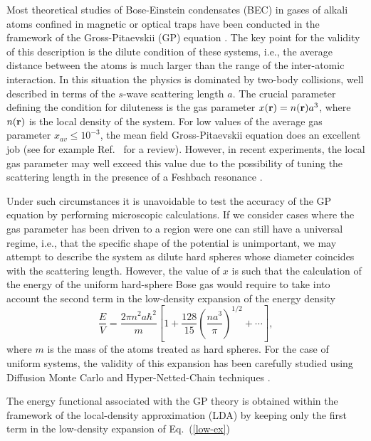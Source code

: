 Most theoretical studies of Bose-Einstein condensates (BEC)
in gases of alkali atoms confined in magnetic or optical traps 
have been conducted in the framework of the 
Gross-Pitaevskii (GP) equation \cite{gross1961,pita1961}. 
The key point for the validity of this description is the
dilute condition of these systems, i.e., the average distance between
the atoms is much larger than the range of the inter-atomic interaction. In
this situation the physics is dominated by two-body collisions,
well described in terms of the $s$-wave scattering length
$a$.  The crucial parameter defining the condition for diluteness is the
gas parameter $x({\bf r})= n({\bf r}) a^3$, where $n({\bf r})$ is the
local density of the system. For low values of the average gas
parameter $x_{av}\le 10^{-3}$, the mean field Gross-Pitaevskii
equation does an excellent job (see for example 
Ref.~\cite{dalfovo1999} for a review). 
However, in recent
experiments, the local gas parameter may well exceed this value due to
the possibility of tuning the scattering length in the presence of a  
Feshbach resonance \cite{cornish00}. 

Under such circumstances it is unavoidable to test the accuracy of
the GP equation by performing microscopic calculations. If we consider cases
where the gas parameter has been driven to a region were one
can still have a universal regime, i.e., that the specific shape of
the potential is unimportant, we may attempt to describe the system as dilute
hard spheres whose diameter coincides with the scattering length.
However, the value of $x$ is such that the
calculation of the energy of the uniform hard-sphere Bose gas would
require to take into account the second term in the low-density
expansion \cite{fetter} of the energy density
\begin{equation}
  \frac {E}{V} = \frac {2 \pi n^2 a \hbar^2}{m}
  \left [ 1 + \frac {128}{15} \left ( \frac {n a^3}{\pi} \right)^{1/2}
          + \cdots \right ],
\label{low-ex}
\end{equation}
where $m$ is the mass of the atoms treated as hard spheres.
For the case of uniform systems, the validity of this expansion has been 
carefully studied using Diffusion Monte Carlo \cite{boro99} and
Hyper-Netted-Chain techniques \cite{mazz03}.

The energy functional associated with the GP theory is obtained
within the framework of  the local-density approximation (LDA) 
by keeping only the first
term in the low-density expansion of Eq.~(\ref{low-ex})

